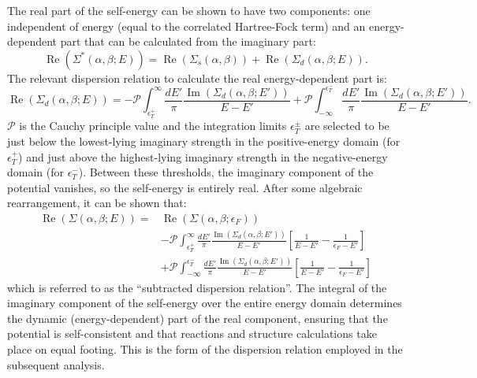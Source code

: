 The real part of the self-energy can be shown to have two components: one independent of energy
(equal to the correlated Hartree-Fock term)
and an energy-dependent part that can be calculated from the imaginary part:
\begin{equation} \label{RealPart}
    \operatorname{Re}(\Sigma^{*}(\alpha,\beta; E)) =
    \operatorname{Re}(\Sigma_{s}(\alpha,\beta)) +
    \operatorname{Re}({\Sigma_{d}(\alpha,\beta; E)}).
\end{equation}
The relevant dispersion relation to calculate the real energy-dependent part is:
\begin{equation} \label{DispersionRelation}
    \operatorname{Re}({\Sigma_{d}(\alpha,\beta; E)}) =
    -\mathcal{P}\int_{\epsilon^{+}_{T}}^{\infty}\frac{dE'}{\pi}
    \frac{\operatorname{Im}({\Sigma_{d}(\alpha,\beta; E')})}{E-E'}
    + \mathcal{P} \int_{-\infty}^{\epsilon^{-}_{T}}\frac{dE'}{\pi}
    \frac{\operatorname{Im}({\Sigma_{d}(\alpha,\beta; E')})}{E-E'}.
\end{equation}
$\mathcal{P}$ is the Cauchy principle value and the integration limits $\epsilon^{\pm}_{T}$ are
selected to be just below the lowest-lying imaginary strength in the positive-energy domain
(for $\epsilon^{+}_{T}$) and just above the highest-lying imaginary strength in the negative-energy
domain (for $\epsilon^{-}_{T}$). Between these thresholds, the imaginary component of the potential
vanishes, so the self-energy is entirely real. After some algebraic rearrangement,
it can be shown that:
\begin{equation} \label{SubtractedDispersionRelation}
    \begin{split}
        \operatorname{Re}({\Sigma(\alpha,\beta; E)}) =
        & \operatorname{Re}({\Sigma(\alpha,\beta;\epsilon_{F})})\\
        & -\mathcal{P}\int_{\epsilon^{+}_{T}}^{\infty}\frac{dE'}{\pi}
        \frac{\operatorname{Im}({\Sigma_{d}(\alpha,\beta; E')})}{E-E'}
        \left[\frac{1}{E-E'}-\frac{1}{\epsilon_{F}-E'}\right]\\
        & + \mathcal{P} \int_{-\infty}^{\epsilon^{-}_{T}}\frac{dE'}{\pi}
        \frac{\operatorname{Im}({\Sigma_{d}(\alpha,\beta; E')})}{E-E'}
        \left[\frac{1}{E-E'}-\frac{1}{\epsilon_{F}-E'}\right]
    \end{split}
\end{equation}
which is referred to as the ``subtracted dispersion relation''. The integral of the imaginary
component of the self-energy over the entire energy domain determines the dynamic (energy-dependent)
part of the real component, ensuring that the potential is self-consistent and that reactions and
structure calculations take place on equal footing. This is the form of the dispersion relation
employed in the subsequent analysis.

